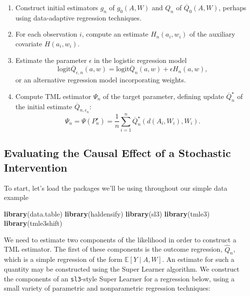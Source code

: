 \documentclass[12pt, krantz2,]{krantz}
\newenvironment{Shaded}{\begin{snugshade}}{\end{snugshade}}
\newcommand{\KeywordTok}[1]{\textcolor[rgb]{0.27,0.27,0.27}{\textbf{#1}}}
\newcommand{\NormalTok}[1]{#1}
\providecommand{\tightlist}{%
  \setlength{\itemsep}{0pt}\setlength{\parskip}{0pt}}
\theoremstyle{definition}
\theoremstyle{definition}
\theoremstyle{definition}
\newcommand{\E}{\mathbb{E}}
\newcommand{\1}{\mathbbm{1}}
\begin{document}
\begin{enumerate}
\def\labelenumi{\arabic{enumi}.}
\tightlist
\item
  Construct initial estimators \(g_n\) of \(g_0(A, W)\) and \(Q_n\) of
  \(\overline{Q}_0(A, W)\), perhaps using data-adaptive regression techniques.
\item
  For each observation \(i\), compute an estimate \(H_n(a_i, w_i)\) of the
  auxiliary covariate \(H(a_i,w_i)\).
\item
  Estimate the parameter \(\epsilon\) in the logistic regression model
  \[ \text{logit}\overline{Q}_{\epsilon, n}(a, w) =
  \text{logit}\overline{Q}_n(a, w) + \epsilon H_n(a, w),\]
  or an alternative regression model incorporating weights.
\item
  Compute TML estimator \(\Psi_n\) of the target parameter, defining update
  \(\overline{Q}_n^{\star}\) of the initial estimate
  \(\overline{Q}_{n, \epsilon_n}\):
  \begin{equation}
    \Psi_n = \Psi(P_n^{\star}) = \frac{1}{n} \sum_{i = 1}^n
    \overline{Q}_n^{\star}(d(A_i, W_i), W_i).
    \label{eq:tmle}
  \end{equation}
\end{enumerate}

\hypertarget{evaluating-the-causal-effect-of-a-stochastic-intervention}{%
\subsection{Evaluating the Causal Effect of a Stochastic Intervention}\label{evaluating-the-causal-effect-of-a-stochastic-intervention}}

To start, let's load the packages we'll be using throughout our simple data example

\begin{Shaded}
\begin{Highlighting}[]
\KeywordTok{library}\NormalTok{(data.table)}
\KeywordTok{library}\NormalTok{(haldensify)}
\KeywordTok{library}\NormalTok{(sl3)}
\KeywordTok{library}\NormalTok{(tmle3)}
\KeywordTok{library}\NormalTok{(tmle3shift)}
\end{Highlighting}
\end{Shaded}

We need to estimate two components of the likelihood in order to construct a TML
estimator. The first of these components is the outcome regression, \(\hat{Q}_n\),
which is a simple regression of the form \(\E[Y \mid A,W]\). An estimate
for such a quantity may be constructed using the Super Learner algorithm. We
construct the components of an \texttt{sl3}-style Super Learner for a regression below,
using a small variety of parametric and nonparametric regression techniques:
\end{document}
